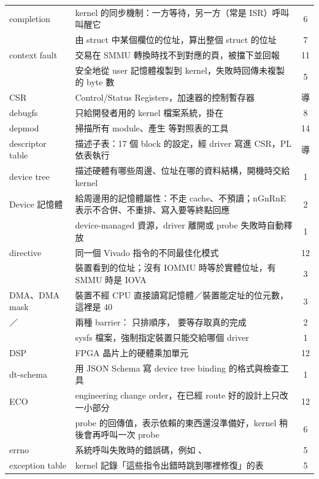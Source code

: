 \begin{xltabular}{\textwidth}{l X c}
completion & kernel 的同步機制：一方等待，另一方（常是 ISR）呼叫  叫醒它 & 6 \\
 & 由 struct 中某個欄位的位址，算出整個 struct 的位址 & 7 \\
context fault & 交易在 SMMU 轉換時找不到對應的頁，被擋下並回報 & 11 \\
 & 安全地從 user 記憶體複製到 kernel，失敗時回傳未複製的 byte 數 & 5 \\
CSR & Control/Status Registers，加速器的控制暫存器 & 導 \\
debugfs & 只給開發者用的 kernel 檔案系統，掛在  & 8 \\
depmod & 掃描所有 module、產生  等對照表的工具 & 14 \\
descriptor table & 描述子表：17 個 block 的設定，經 driver 寫進 CSR，PL 依表執行 & 導 \\
device tree & 描述硬體有哪些周邊、位址在哪的資料結構，開機時交給 kernel & 1 \\
Device 記憶體 & 給周邊用的記憶體屬性：不走 cache、不預讀；nGnRnE 表示不合併、不重排、寫入要等終點回應 & 2 \\
 & device-managed 資源，driver 離開或 probe 失敗時自動釋放 & 1 \\
directive & 同一個 Vivado 指令的不同最佳化模式 & 12 \\
 & 裝置看到的位址；沒有 IOMMU 時等於實體位址，有 SMMU 時是 IOVA & 3 \\
DMA、DMA mask & 裝置不經 CPU 直接讀寫記憶體／裝置能定址的位元數，這裡是 40 & 3 \\
／ & 兩種 barrier： 只排順序， 要等存取真的完成 & 2 \\
 & sysfs 檔案，強制指定裝置只能交給哪個 driver & 1 \\
DSP & FPGA 晶片上的硬體乘加單元 & 12 \\
dt-schema & 用 JSON Schema 寫 device tree binding 的格式與檢查工具 & 1 \\
ECO & engineering change order，在已經 route 好的設計上只改一小部分 & 12 \\
 & probe 的回傳值，表示依賴的東西還沒準備好，kernel 稍後會再呼叫一次 probe & 6 \\
errno & 系統呼叫失敗時的錯誤碼，例如 、 & 5 \\
exception table & kernel 記錄「這些指令出錯時跳到哪裡修復」的表 & 5 \\

\end{xltabular}
